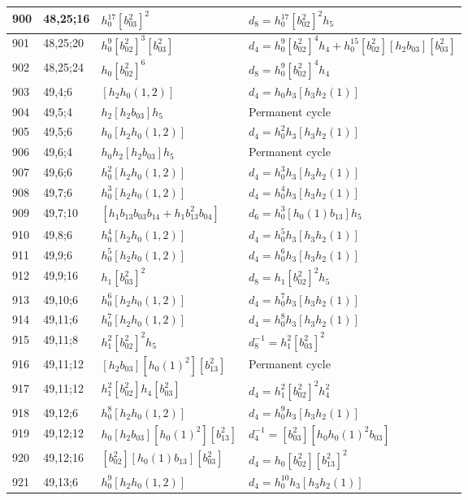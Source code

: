 \documentclass{article}
\begin{document}
\begin{longtable}{|l|l|>{\raggedright\arraybackslash}p{6cm}|>{\raggedright\arraybackslash}p{6cm}|}
\hline
900 & 48,25;16 & $h_0^{17}[b_{03}^2]^2$ &$d_{8}=h_0^{17}[b_{02}^2]^2h_5$\\
\hline
901 & 48,25;20 & $h_0^9[b_{02}^2]^3[b_{03}^2]$ &$d_{4}=h_0^9[b_{02}^2]^4h_4 + h_0^{15}[b_{02}^2][h_2b_{03}][b_{03}^2]$\\
\hline
902 & 48,25;24 & $h_0[b_{02}^2]^6$ &$d_{8}=h_0^9[b_{02}^2]^4h_4$\\
\hline
903 & 49,4;6 & $[h_2h_0(1, 2)]$ &$d_{4}=h_0h_3[h_3h_2(1)]$\\
\hline
904 & 49,5;4 & $h_2[h_2b_{03}]h_5$ & Permanent cycle\\
\hline
905 & 49,5;6 & $h_0[h_2h_0(1, 2)]$ &$d_{4}=h_0^2h_3[h_3h_2(1)]$\\
\hline
906 & 49,6;4 & $h_0h_2[h_2b_{03}]h_5$ & Permanent cycle\\
\hline
907 & 49,6;6 & $h_0^2[h_2h_0(1, 2)]$ &$d_{4}=h_0^3h_3[h_3h_2(1)]$\\
\hline
908 & 49,7;6 & $h_0^3[h_2h_0(1, 2)]$ &$d_{4}=h_0^4h_3[h_3h_2(1)]$\\
\hline
909 & 49,7;10 & $[h_1b_{13}b_{03}b_{14} + h_1b_{13}^2b_{04}]$ &$d_{6}=h_0^3[h_0(1)b_{13}]h_5$\\
\hline
910 & 49,8;6 & $h_0^4[h_2h_0(1, 2)]$ &$d_{4}=h_0^5h_3[h_3h_2(1)]$\\
\hline
911 & 49,9;6 & $h_0^5[h_2h_0(1, 2)]$ &$d_{4}=h_0^6h_3[h_3h_2(1)]$\\
\hline
912 & 49,9;16 & $h_1[b_{03}^2]^2$ &$d_{8}=h_1[b_{02}^2]^2h_5$\\
\hline
913 & 49,10;6 & $h_0^6[h_2h_0(1, 2)]$ &$d_{4}=h_0^7h_3[h_3h_2(1)]$\\
\hline
914 & 49,11;6 & $h_0^7[h_2h_0(1, 2)]$ &$d_{4}=h_0^8h_3[h_3h_2(1)]$\\
\hline
915 & 49,11;8 & $h_1^2[b_{02}^2]^2h_5$ & $d_{8}^{-1}=h_1^2[b_{03}^2]^2$\\
\hline
916 & 49,11;12 & $[h_2b_{03}][h_0(1)^2][b_{13}^2]$ & Permanent cycle\\
917 & 49,11;12 & $h_1^2[b_{02}^2]h_4[b_{03}^2]$ &$d_{4}=h_1^2[b_{02}^2]^2h_4^2$\\
\hline
918 & 49,12;6 & $h_0^8[h_2h_0(1, 2)]$ &$d_{4}=h_0^9h_3[h_3h_2(1)]$\\
\hline
919 & 49,12;12 & $h_0[h_2b_{03}][h_0(1)^2][b_{13}^2]$ & $d_{4}^{-1}=[b_{03}^2][h_0h_0(1)^2b_{03}]$\\
\hline
920 & 49,12;16 & $[b_{02}^2][h_0(1)b_{13}][b_{03}^2]$ &$d_{4}=h_0[b_{02}^2][b_{13}^2]^2$\\
\hline
921 & 49,13;6 & $h_0^9[h_2h_0(1, 2)]$ &$d_{4}=h_0^{10}h_3[h_3h_2(1)]$\\

\end{longtable}
\end{document}
